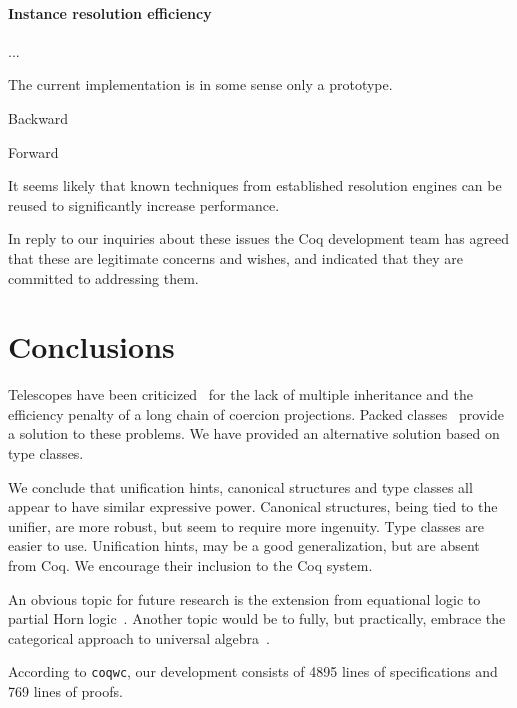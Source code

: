 \documentclass[a4paper,10pt,runningheads]{llncs}
\begin{document}
\paragraph{Instance resolution efficiency} ...

The current implementation is in some sense only a prototype.

Backward

Forward

It seems likely that known techniques from established resolution engines can be reused to significantly increase performance.


In reply to our inquiries about these issues the Coq development team has agreed that these are legitimate concerns and wishes, and indicated that they are committed to addressing them.





\section{Conclusions}
Telescopes have been criticized~\cite{Packed} for the lack of multiple inheritance and
the efficiency penalty of a long chain of coercion projections. Packed classes~\cite{Packed} provide
a solution to these problems. We have provided an alternative solution based on type classes. 

We conclude that unification hints, canonical structures and type classes all appear to have
similar expressive power. Canonical structures, being tied to the unifier, are more robust, but
seem to require more ingenuity. Type classes are easier to use. Unification hints, may be a
good generalization, but are absent from Coq. We encourage their inclusion to the
Coq system.

An obvious topic for future research is the extension from equational logic to partial Horn
logic~\cite{palmgren2007partial}. Another topic would be to fully, but practically, embrace the
categorical approach to universal algebra~\cite{pitts2001categorical}.

According to \lstinline|coqwc|, our development consists of 4895 lines of
specifications and 769 lines of proofs.


% 
\end{document}
